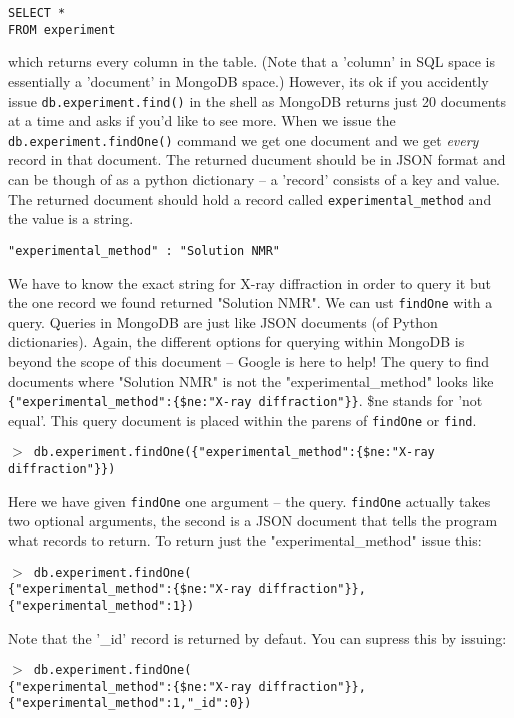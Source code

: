 \documentclass[12pt]{article}
\newcommand{\mdbcmdline}[1]{\vspace{5mm} \noindent
\texttt{$>$ #1}
\vspace{5mm}

}
\begin{document}
\vspace{5mm}
\noindent
\texttt{SELECT *\\
FROM experiment}

\vspace{5mm}
\noindent
which returns every column in the table. 
(Note that a 'column' in SQL space is essentially a 'document' in MongoDB space.)
However, its ok if you accidently issue \texttt{db.experiment.find()} in the shell as MongoDB returns just 20 documents at a time and asks if you'd like to see more.
When we issue the \texttt{db.experiment.findOne()} command we get one document and we get \textit{every} record in that document.
The returned ducument should be in JSON format and can be though of as a python dictionary -- a 'record' consists of a key and value.
The returned document should hold a record called \texttt{experimental\_method} and the value is a string.

\vspace{5mm}
\noindent
\texttt{"experimental\_method" : "Solution NMR"}

\vspace{5mm}
\noindent
We have to know the exact string for X-ray diffraction in order to query it but the one record we found returned "Solution NMR".
We can ust \texttt{findOne} with a query.
Queries in MongoDB are just like JSON documents (of Python dictionaries).
Again, the different options for querying within MongoDB is beyond the scope of this document -- Google is here to help!
The query to find documents where "Solution NMR" is not the "experimental\_method" looks like \texttt{\{"experimental\_method":\{\$ne:"X-ray diffraction"\}\}}. \$ne stands for 'not equal'.
This query document is placed within the parens of \texttt{findOne} or \texttt{find}.

\mdbcmdline{db.experiment.findOne(\{"experimental\_method":\{\$ne:"X-ray diffraction"\}\})}
\noindent
Here we have given \texttt{findOne} one argument -- the query. 
\texttt{findOne} actually takes two optional arguments, the second is a JSON document that tells the program what records to return.
To return just the "experimental\_method" issue this:

\mdbcmdline{db.experiment.findOne(\\
\{"experimental\_method":\{\$ne:"X-ray diffraction"\}\}, \\
\{"experimental\_method":1\})
}

\noindent
Note that the '\_id' record is returned by defaut.
You can supress this by issuing:

\mdbcmdline{db.experiment.findOne(\\
\{"experimental\_method":\{\$ne:"X-ray diffraction"\}\}, \\
\{"experimental\_method":1,"\_id":0\})
}
\noindent
\end{document}
